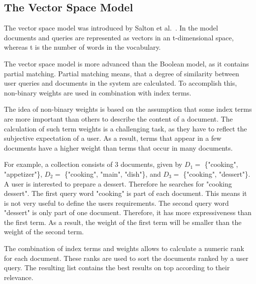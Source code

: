 \subsection{The Vector Space Model}
\label{sec:the_vector_space_model}

The vector space model was introduced by Salton et al.~\cite{salton75vsm}. In the model documents and queries are represented as vectors in an t-dimensional space, whereas t is the number of words in the vocabulary.

The vector space model is more advanced than the Boolean model, as it contains partial matching. Partial matching means, that a degree of similarity between user queries and documents in the system are calculated. To accomplish this, non-binary weights are used in combination with index terms.

The idea of non-binary weights is based on the assumption that some index terms are more important than others to describe the content of a document. The calculation of such term weights is a challenging task, as they have to reflect the subjective expectation of a user. As a result, terms that appear in a few documents have a higher weight than terms that occur in many documents. 

For example, a collection consists of $3$ documents, given by $D_1 =$ \{"cooking", "appetizer"\}, $D_2 =$ \{"cooking", "main", "dish"\}, and $D_3 =$ \{"cooking", "dessert"\}. A user is interested to prepare a dessert. Therefore he searches for "cooking dessert". The first query word "cooking" is part of each document. This means it is not very useful to define the users requirements. The second query word "dessert" is only part of one document. Therefore, it has more expressiveness than the first term. As a result, the weight of the first term will be smaller than the weight of the second term.

The combination of index terms and weights allows to calculate a numeric rank for each document. These ranks are used to sort the documents ranked by a user query. The resulting list contains the best results on top according to their relevance.

